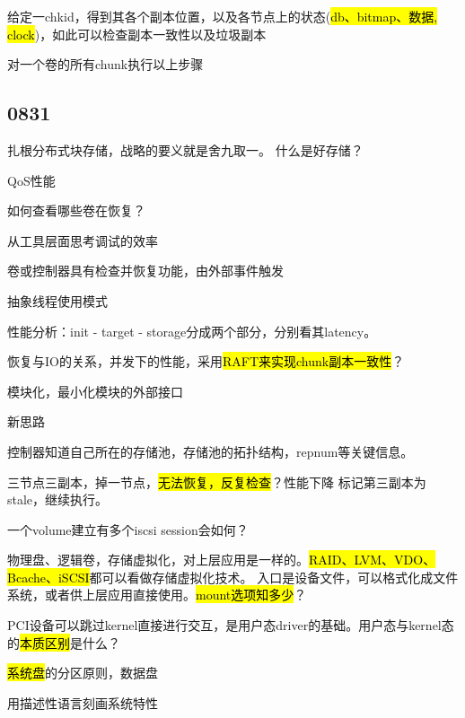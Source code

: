 \begin{enumbox}
\item 给定一chkid，得到其各个副本位置，以及各节点上的状态(\hl{db、bitmap、数据, clock})，如此可以检查副本一致性以及垃圾副本
\item 对一个卷的所有chunk执行以上步骤
\end{enumbox}

\subsection{0831}

扎根分布式块存储，战略的要义就是舍九取一。
什么是好存储？

\begin{enumbox}
\item QoS性能
\item 如何查看哪些卷在恢复？
\item 从工具层面思考调试的效率
\item 卷或控制器具有检查并恢复功能，由外部事件触发
\item 抽象线程使用模式
\item 性能分析：init - target - storage分成两个部分，分别看其latency。
\item 恢复与IO的关系，并发下的性能，采用\hl{RAFT来实现chunk副本一致性}？
\item 模块化，最小化模块的外部接口
\end{enumbox}

新思路
\begin{enumbox}
\item 控制器知道自己所在的存储池，存储池的拓扑结构，repnum等关键信息。
\end{enumbox}

三节点三副本，掉一节点，\hl{无法恢复，反复检查}？性能下降
标记第三副本为stale，继续执行。

一个volume建立有多个iscsi session会如何？

物理盘、逻辑卷，存储虚拟化，对上层应用是一样的。\hl{RAID、LVM、VDO、Bcache、iSCSI}都可以看做存储虚拟化技术。
入口是设备文件，可以格式化成文件系统，或者供上层应用直接使用。\hl{mount选项知多少}？

PCI设备可以跳过kernel直接进行交互，是用户态driver的基础。用户态与kernel态的\hl{本质区别}是什么？

\hl{系统盘}的分区原则，数据盘

用描述性语言刻画系统特性
